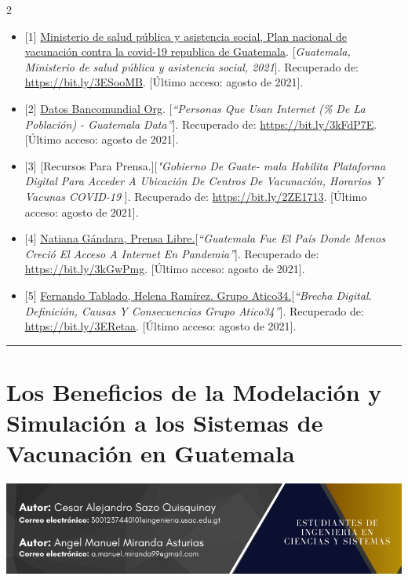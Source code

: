 \documentclass[12pt,spanish,Letterpaper,openany]{book}
\newcommand{\HRule}{\begin{center}\rule{0.5\linewidth}{0.2mm}\end{center}}
\begin{document}
\begin {multicols}{2}
\begin{itemize}
\item
  {[}1{]} \href{https://www.mspas.gob.gt/}{Ministerio de salud pública y asistencia social, Plan nacional de vacunación contra la covid-19 republica de Guatemala}. {[}\emph{Guatemala, Ministerio de salud pública y asistencia social, 2021}{]}. Recuperado de: \url{https://bit.ly/3ESooMB}. {[}Último acceso: agosto de 2021{]}.
\item
  {[}2{]} \href{https://portal.ingenieria.usac.edu.gt/}{Datos Bancomundial Org}. {[}\emph{``Personas Que Usan Internet (\% De La Población) - Guatemala \textbar{} Data''}{]}. Recuperado de: \url{https://bit.ly/3kFdP7E}. {[}Último acceso: agosto de 2021{]}.
\item
  {[}3{]} {[}Recursos Para Prensa.{]}{[}\emph{"Gobierno De Guate-
  mala Habilita Plataforma Digital Para Acceder A Ubicación De Centros De Vacunación, Horarios Y Vacunas COVID-19 }{]}. Recuperado de: \url{https://bit.ly/2ZE1713}. {[}Último acceso: agosto de 2021{]}.
\item
  {[}4{]} \href{https://www.prensalibre.com/}{Natiana Gándara, Prensa Libre.}{[}\emph{``Guatemala Fue El País Donde Menos Creció El Acceso A Internet En Pandemia''}{]}. Recuperado de: \url{https://bit.ly/3kGwPmg}. {[}Último acceso: agosto de 2021{]}.
\item
  {[}5{]} \href{https://protecciondatos-lopd.com/}{Fernando Tablado, Helena Ramírez. Grupo Atico34.}{[}\emph{``Brecha Digital. Definición, Causas Y Consecuencias \textbar{} Grupo Atico34''}{]}. Recuperado de: \url{https://bit.ly/3ERetaa}. {[}Último acceso: agosto de 2021{]}.
\end{itemize}

\end {multicols}

\medskip

\HRule

\medskip

\hypertarget{pareja30}{%
\chapter{Los Beneficios de la Modelación y Simulación a los Sistemas de Vacunación en Guatemala}\label{pareja30}}

\begin{center}\includegraphics[width=1\linewidth]{images/pareja30_01} \end{center}
\end{document}
